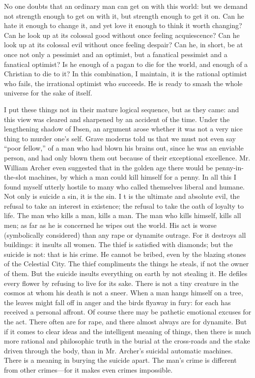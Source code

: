 \documentclass{book}
\begin{document}
No one doubts that an ordinary man can get on with this world: but we demand not strength enough to get on with it, but strength enough to get it on. Can he hate it enough to change it, and yet love it enough to think it worth changing? Can he look up at its colossal good without once feeling acquiescence? Can he look up at its colossal evil without once feeling despair? Can he, in short, be at once not only a pessimist and an optimist, but a fanatical pessimist and a fanatical optimist? Is he enough of a pagan to die for the world, and enough of a Christian to die to it? In this combination, I maintain, it is the rational optimist who fails, the irrational optimist who succeeds. He is ready to smash the whole universe for the sake of itself.

I put these things not in their mature logical sequence, but as they came: and this view was cleared and sharpened by an accident of the time. Under the lengthening shadow of Ibsen, an argument arose whether it was not a very nice thing to murder one’s self. Grave moderns told us that we must not even say “poor fellow,” of a man who had blown his brains out, since he was an enviable person, and had only blown them out because of their exceptional excellence. Mr. William Archer even suggested that in the golden age there would be penny-in-the-slot machines, by which a man could kill himself for a penny. In all this I found myself utterly hostile to many who called themselves liberal and humane. Not only is suicide a sin, it is the sin. I t is the ultimate and absolute evil, the refusal to take an interest in existence; the refusal to take the oath of loyalty to life. The man who kills a man, kills a man. The man who kills himself, kills all men; as far as he is concerned he wipes out the world. His act is worse (symbolically considered) than any rape or dynamite outrage. For it destroys all buildings: it insults all women. The thief is satisfied with diamonds; but the suicide is not: that is his crime. He cannot be bribed, even by the blazing stones of the Celestial City. The thief compliments the things he steals, if not the owner of them. But the suicide insults everything on earth by not stealing it. He defiles every flower by refusing to live for its sake. There is not a tiny creature in the cosmos at whom his death is not a sneer. When a man hangs himself on a tree, the leaves might fall off in anger and the birds flyaway in fury: for each has received a personal affront. Of course there may be pathetic emotional excuses for the act. There often are for rape, and there almost always are for dynamite. But if it comes to clear ideas and the intelligent meaning of things, then there is much more rational and philosophic truth in the burial at the cross-roads and the stake driven through the body, than in Mr. Archer’s suicidal automatic machines. There is a meaning in burying the suicide apart. The man’s crime is different from other crimes—for it makes even crimes impossible.
\end{document}
